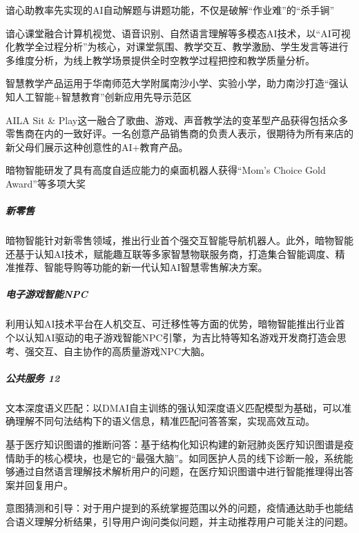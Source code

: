 \documentclass[letterpaper,11pt,english]{sphinxmanual}
\begin{document}
谙心助教率先实现的AI自动解题与讲题功能，不仅是破解“作业难”的“杀手锏”

谙心课堂融合计算机视觉、语音识别、自然语言理解等多模态AI技术，以“AI可视化教学全过程分析”为核心，对课堂氛围、教学交互、教学激励、学生发言等进行多维度分析，为线上教学场景提供全时空教学过程把控和教学质量分析。

智慧教学产品运用于华南师范大学附属南沙小学、实验小学，助力南沙打造“强认知人工智能+智慧教育”创新应用先导示范区

AILA Sit \&
Play这一融合了歌曲、游戏、声音教学法的变革型产品获得包括众多零售商在内的一致好评。一名创意产品销售商的负责人表示，很期待为所有来店的新父母们展示这种创意性的AI+教育产品。

暗物智能研发了具有高度自适应能力的桌面机器人获得“Mom’s Choice Gold
Award”等多项大奖


\subparagraph{新零售}
\label{\detokenize{chapter_company/dm-ai:id10}}
暗物智能针对新零售领域，推出行业首个强交互智能导航机器人。此外，暗物智能还基于认知AI技术，赋能趣互联等多家智慧物联服务商，打造集合智能调度、精准推荐、智能导购等功能的新一代认知AI智慧零售解决方案。


\subparagraph{电子游戏智能NPC}
\label{\detokenize{chapter_company/dm-ai:npc}}
利用认知AI技术平台在人机交互、可迁移性等方面的优势，暗物智能推出行业首个以认知AI驱动的电子游戏智能NPC引擎，为吉比特等知名游戏开发商打造会思考、强交互、自主协作的高质量游戏NPC大脑。


\subparagraph{公共服务 12\sphinxfootnotemark[894]}
\label{\detokenize{chapter_company/dm-ai:id11}}%
\begin{footnotetext}[894]\sphinxAtStartFootnote
{}
%
\end{footnotetext}\ignorespaces 
文本深度语义匹配：以DMAI自主训练的强认知深度语义匹配模型为基础，可以准确理解不同句法结构下的语义信息，精准匹配问答答案，实现高效互动。

基于医疗知识图谱的推断问答：基于结构化知识构建的新冠肺炎医疗知识图谱是疫情助手的核心模块，也是它的“最强大脑”。如同医护人员的线下诊断一般，系统能够通过自然语言理解技术解析用户的问题，在医疗知识图谱中进行智能推理得出答案并回复用户。

意图猜测和引导：对于用户提到的系统掌握范围以外的问题，疫情通达助手也能结合语义理解分析结果，引导用户询问类似问题，并主动推荐用户可能关注的问题。
\end{document}
